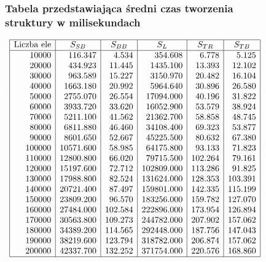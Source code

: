 \documentclass[polish,polish,a4paper]{article}
\begin{document}
\begin{spacing}{1.5}
\begin{figure}[H]
	\subsubsection*{Tabela przedstawiająca średni czas tworzenia struktury w milisekundach}
	\centering
	\begin{equation*}
	\begin{array}{|r|r|r|r|r|r|}
	\hline
	\multicolumn{1}{|c|}{$Liczba ele$}&\multicolumn{1}{c|}{S_{SB}}&\multicolumn{1}{c|}{S_{BB}}&\multicolumn{1}{c|}{S_{L}}&\multicolumn{1}{c|}{S_{TR}}&\multicolumn{1}{c|}{S_{TB}}\\ \hline
10000&116.347&4.534&354.608&6.778&5.125\\
20000&434.923&11.445&1435.100&13.393&12.102\\
30000&963.589&15.227&3150.970&20.482&16.104\\
40000&1663.180&20.992&5964.640&30.896&26.580\\
50000&2755.070&26.554&17094.000&40.196&31.822\\
60000&3933.720&33.620&16052.900&53.579&38.924\\
70000&5211.100&41.562&21362.700&58.858&48.745\\
80000&6811.880&46.460&34108.400&69.323&53.877\\
90000&8601.650&52.667&45225.500&80.632&67.380\\
100000&10571.600&58.985&64175.800&93.133&71.823\\
110000&12800.800&66.020&79715.500&102.264&79.161\\
120000&15197.600&72.712&102809.000&113.286&91.825\\
130000&17988.800&82.524&131624.000&128.353&103.391\\
140000&20721.400&87.497&159801.000&142.335&115.199\\
150000&23809.200&96.570&183256.000&159.782&127.070\\
160000&27484.000&102.584&222896.000&173.954&126.894\\
170000&30563.800&109.273&244782.000&207.902&157.062\\
180000&34389.200&114.565&292448.000&187.756&147.043\\
190000&38219.600&123.794&318782.000&206.874&157.062\\
200000&42337.700&132.252&371754.000&220.576&168.860\\\hline
	\end{array}
	\end{equation*}
\end{figure}


\end{spacing}
\end{document}
